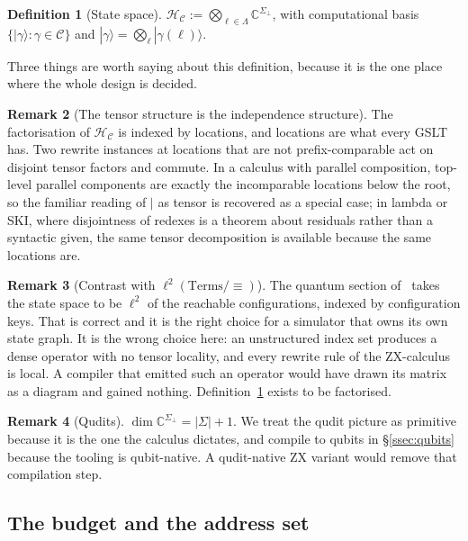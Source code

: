 \documentclass[11pt]{article}
\theoremstyle{definition}
\newtheorem{definition}{Definition}[section]
\newtheorem{remark}[definition]{Remark}
\theoremstyle{plain}
\newcommand{\Loc}{\Lambda}
\newcommand{\Tags}{\Sigma}
\newcommand{\Tagsb}{\Tags_{\bot}}
\newcommand{\Cfg}{\mathcal{C}}
\newcommand{\Hs}{\mathcal{H}}
\newcommand{\Hc}{\Hs_{\Cfg}}
\newcommand{\ket}[1]{| #1 \rangle}
\begin{document}
\begin{definition}[State space]\label{def:hilbert}
$\Hc := \bigotimes_{\ell \in \Loc} \mathbb{C}^{\Tagsb}$, with computational basis
$\{\ket{\gamma} : \gamma \in \Cfg\}$ and $\ket{\gamma} = \bigotimes_{\ell} \ket{\gamma(\ell)}$.
\end{definition}

Three things are worth saying about this definition, because it is the one place where the
whole design is decided.

\begin{remark}[The tensor structure is the independence structure]\label{rem:independence}
The factorisation of $\Hc$ is indexed by locations, and locations are what every GSLT has. Two
rewrite instances at locations that are not prefix-comparable act on disjoint tensor factors
and commute. In a calculus with parallel composition, top-level parallel components are exactly
the incomparable locations below the root, so the familiar reading of $\mid$ as tensor is
recovered as a special case; in lambda or SKI, where disjointness of redexes is a theorem about
residuals rather than a syntactic given, the same tensor decomposition is available because the
same locations are.
\end{remark}

\begin{remark}[Contrast with $\ell^2(\mathrm{Terms}/\!\equiv)$]\label{rem:contrast}
The quantum section of~\cite{weighted} takes the state space to be $\ell^2$ of the reachable
configurations, indexed by configuration keys. That is correct and it is the right choice for a
simulator that owns its own state graph. It is the wrong choice here: an unstructured index set
produces a dense operator with no tensor locality, and every rewrite rule of the ZX-calculus is
local. A compiler that emitted such an operator would have drawn its matrix as a diagram and
gained nothing. Definition~\ref{def:hilbert} exists to be factorised.
\end{remark}

\begin{remark}[Qudits]\label{rem:qudits}
$\dim \mathbb{C}^{\Tagsb} = |\Tags| + 1$. We treat the qudit picture as primitive because it is
the one the calculus dictates, and compile to qubits in \S\ref{ssec:qubits} because the tooling
is qubit-native. A qudit-native ZX variant would remove that compilation step.
\end{remark}

\subsection{The budget and the address set}\label{ssec:address}
\end{document}
